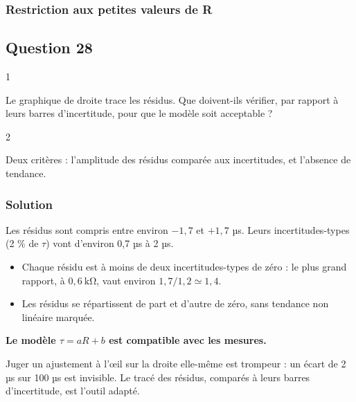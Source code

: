 \documentclass[11pt,a4paper]{article}
\providecommand{\tightlist}{\setlength{\itemsep}{0pt}\setlength{\parskip}{0pt}}
\begin{document}
\hypertarget{restriction-aux-petites-valeurs-de-r}{%
\subsubsection{Restriction aux petites valeurs de R}\label{restriction-aux-petites-valeurs-de-r}}

\hypertarget{question-28}{%
\subsection{Question 28}\label{question-28}}

\begin{indication}{1}

Le graphique de droite trace les résidus. Que doivent-ils vérifier, par rapport à leurs barres d'incertitude, pour que le modèle soit acceptable ?

\end{indication}

\begin{indication}{2}

Deux critères : l'amplitude des résidus comparée aux incertitudes, et l'absence de tendance.

\end{indication}

\hypertarget{solution-27}{%
\subsubsection{Solution}\label{solution-27}}

Les résidus sont compris entre environ \(-1{,}7\) et \(+1{,}7\) µs. Leurs incertitudes-types (2 \% de \(\tau\)) vont d'environ 0,7 µs à 2 µs.

\begin{itemize}
\tightlist
\item
  Chaque résidu est à moins de deux incertitudes-types de zéro : le plus grand rapport, à \(0{,}6\ \mathrm{k\Omega}\), vaut environ \(1{,}7/1{,}2\simeq1{,}4\).
\item
  Les résidus se répartissent de part et d'autre de zéro, sans tendance non linéaire marquée.
\end{itemize}

\textbf{Le modèle \(\tau=aR+b\) est compatible avec les mesures.}

\begin{methode}

Juger un ajustement à l'œil sur la droite elle-même est trompeur : un écart de 2 µs sur 100 µs est invisible. Le tracé des résidus, comparés à leurs barres d'incertitude, est l'outil adapté.

\end{methode}
\end{document}
